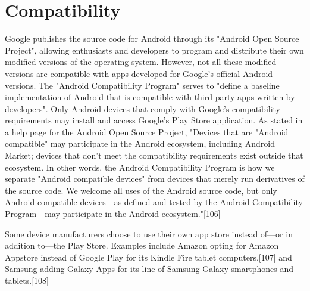 \documentclass{article}                    %
\begin{document}
\section{ Compatibility}    
Google publishes the source code for Android through its "Android Open Source Project", allowing enthusiasts and developers to program and distribute their own modified versions of the operating system. However, not all these modified versions are compatible with apps developed for Google's official Android versions. The "Android Compatibility Program" serves to "define a baseline implementation of Android that is compatible with third-party apps written by developers". Only Android devices that comply with Google's compatibility requirements may install and access Google's Play Store application. As stated in a help page for the Android Open Source Project, "Devices that are "Android compatible" may participate in the Android ecosystem, including Android Market; devices that don't meet the compatibility requirements exist outside that ecosystem. In other words, the Android Compatibility Program is how we separate "Android compatible devices" from devices that merely run derivatives of the source code. We welcome all uses of the Android source code, but only Android compatible devices—as defined and tested by the Android Compatibility Program—may participate in the Android ecosystem."[106]

Some device manufacturers choose to use their own app store instead of—or in addition to—the Play Store. Examples include Amazon opting for Amazon Appstore instead of Google Play for its Kindle Fire tablet computers,[107] and Samsung adding Galaxy Apps for its line of Samsung Galaxy smartphones and tablets.[108]
\end{document}
